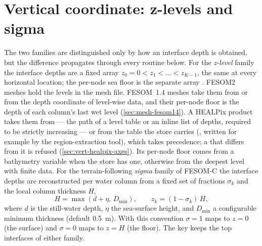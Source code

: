 
\section{Vertical coordinate: z-levels and sigma}\label{sec:vert-coord}

The two families are distinguished only by how an interface depth is obtained, but the difference
propagates through every routine below. For the \emph{z-level} family the interface depths are a
fixed array $z_0=0<z_1<\dots<z_{K-1}$, the same at every horizontal location; the per-node sea floor is
the separate array . FESOM2 meshes hold the levels in the mesh file. FESOM~1.4 meshes take
them from  or from the depth coordinate of level-wise data, and their per-node floor is
the depth of each column's last wet level (\cref{sec:mesh-fesom14}). A HEALPix product
takes them from  --- the path of a level table or an inline list of depths, required to
be strictly increasing --- or from the table the store carries (, written for
example by the region-extraction tool), which takes precedence; a  that differs from it is
refused (\cref{sec:vert-healpix-axes}). Its per-node floor comes from
a bathymetry variable when the store has one, otherwise from the deepest level with finite data. For
the terrain-following \emph{sigma} family of FESOM-C the interface depths are reconstructed per water
column from a fixed set of fractions $\sigma_k$ and the local column thickness $H$,
\begin{equation}\label{eq:sigma}
  H = \max(d+\eta,\,D_{\min}), \qquad z_k = (1-\sigma_k)\,H,
\end{equation}
where $d$ is the still-water depth, $\eta$ the sea-surface height, and $D_{\min}$ a configurable minimum
thickness (default \SI{0.5}{\metre}). With this convention $\sigma=1$ maps to $z=0$ (the surface) and
$\sigma=0$ maps to $z=H$ (the floor). The key  keeps the top
 interfaces of either family.

